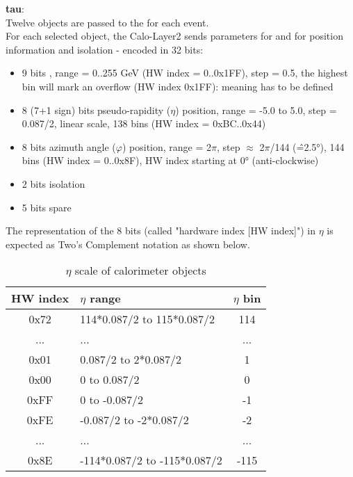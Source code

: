 \textbf{tau}:\\ Twelve objects are passed to the \ugt for each event.\\
For each selected object, the Calo-Layer2 sends parameters for \pt and for position information and isolation - encoded in 32 bits:
\begin{itemize}
\item 9 bits \pt, range = 0..255 GeV (HW index = 0..0x1FF), step = 0.5, the highest bin will mark an overflow (HW index 0x1FF): meaning has to be defined
\item 8 (7+1 sign) bits pseudo-rapidity ($\eta$) position, range = -5.0 to 5.0, step = 0.087/2, linear scale, 138 bins (HW index = 0xBC..0x44)
\item 8 bits azimuth angle ($\varphi$) position, range = 2$\pi$, step $\approx$ 2$\pi$/144 (\^=2.5°), 144 bins (HW index = 0..0x8F), HW index starting at 0° (anti-clockwise)
\item 2 bits isolation
\item 5 bits spare
\end{itemize}


The representation of the 8 bits (called "hardware index [HW index]") in $\eta$ is expected as Two's Complement notation as shown below.\\

\begin{table}[ht]
\caption{$\eta$ scale of calorimeter objects}
\vspace{5mm}
\centering
\begin{tabular}{|c|l|c|}\hline
\textbf{HW index}& \textbf{$\eta$ range} & \textbf{$\eta$ bin}\\\hline\hline
0x72 & 114$*$0.087/2 to 115$*$0.087/2 & 114\\\hline
... & ... & ...\\\hline
0x01 & 0.087/2 to 2$*$0.087/2 & 1\\\hline
0x00 & 0 to 0.087/2 & 0\\\hline
0xFF & 0 to -0.087/2 & -1\\\hline
0xFE & -0.087/2 to -2$*$0.087/2 & -2\\\hline
... & ... & ...\\\hline
0x8E & -114$*$0.087/2 to -115$*$0.087/2 & -115\\\hline
\end{tabular}
\label{tab:gtl:calo_eta_scale_new}
\end{table}

